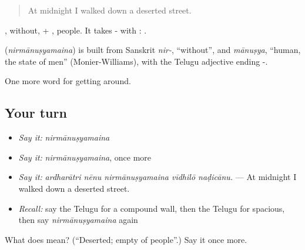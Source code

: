 \begin{quote}
At midnight I walked down a deserted street.
\end{quote}

, without, + , people. It takes - with :  .

\begin{cousinweb}
\textbf{} (\emph{nirmānuṣyamaina}) is built from Sanskrit \emph{nir-}, \textquotedblleft{}without\textquotedblright{}, and \emph{mānuṣya}, \textquotedblleft{}human, the state of men\textquotedblright{} (Monier-Williams), with the Telugu adjective ending -.
\end{cousinweb}

\begin{grammarlens}[title={What you've built}]
One more word for getting around.
\end{grammarlens}

\subsection*{Your turn}
\begin{itemize}
\raggedright
  \item \emph{Say it:} \emph{nirmānuṣyamaina}
  \item \emph{Say it:} \emph{nirmānuṣyamaina}, once more
  \item \emph{Say it:} \emph{ardharātri nēnu nirmānuṣyamaina vīdhilō naḍicānu.} — At midnight I walked down a deserted street.
  \item \emph{Recall:} say the Telugu for a compound wall, then the Telugu for spacious, then say \emph{nirmānuṣyamaina} again
\end{itemize}

\begin{tcolorbox}[breakable,colback=teal!4,colframe=teal!35!black,title={Before you move on}]
What does  mean? (\textquotedblleft{}Deserted; empty of people\textquotedblright{}.) Say it once more.
\end{tcolorbox}
